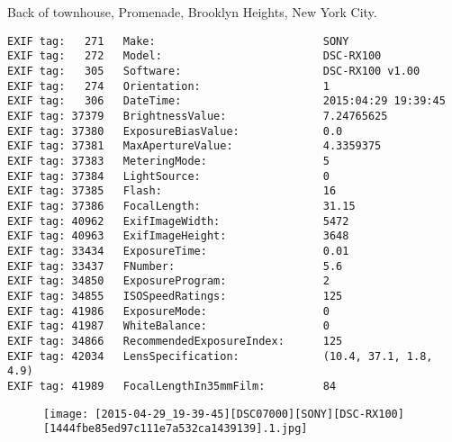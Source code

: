 \section{\protect{}}
\noindent Back of townhouse, Promenade, Brooklyn Heights, New York City.
\noindent
\begin{lstlisting}
EXIF tag:   271   Make:                          SONY
EXIF tag:   272   Model:                         DSC-RX100
EXIF tag:   305   Software:                      DSC-RX100 v1.00
EXIF tag:   274   Orientation:                   1
EXIF tag:   306   DateTime:                      2015:04:29 19:39:45
EXIF tag: 37379   BrightnessValue:               7.24765625
EXIF tag: 37380   ExposureBiasValue:             0.0
EXIF tag: 37381   MaxApertureValue:              4.3359375
EXIF tag: 37383   MeteringMode:                  5
EXIF tag: 37384   LightSource:                   0
EXIF tag: 37385   Flash:                         16
EXIF tag: 37386   FocalLength:                   31.15
EXIF tag: 40962   ExifImageWidth:                5472
EXIF tag: 40963   ExifImageHeight:               3648
EXIF tag: 33434   ExposureTime:                  0.01
EXIF tag: 33437   FNumber:                       5.6
EXIF tag: 34850   ExposureProgram:               2
EXIF tag: 34855   ISOSpeedRatings:               125
EXIF tag: 41986   ExposureMode:                  0
EXIF tag: 41987   WhiteBalance:                  0
EXIF tag: 34866   RecommendedExposureIndex:      125
EXIF tag: 42034   LensSpecification:             (10.4, 37.1, 1.8, 4.9)
EXIF tag: 41989   FocalLengthIn35mmFilm:         84

\end{lstlisting}
\clearpage
\begin{figure}
\raggedleft
\texttt{[image: [2015-04-29\_19-39-45][DSC07000][SONY][DSC-RX100][1444fbe85ed97c111e7a532ca1439139].1.jpg]}
\end{figure}


\clearpage
